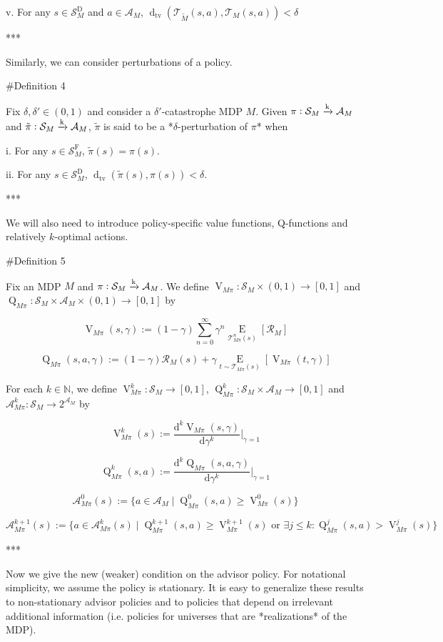 \documentclass[a4paper]{article}
\newcommand{\AP}[1]{\left(#1\right)}
\newcommand{\AB}[1]{\left[#1\right]}
\newcommand{\Ea}[2]{\underset{#1}{\operatorname{E}}\AB{#2}}
\newcommand{\D}{\mathrm{d}}
\newcommand{\Dtva}[1]{\operatorname{d}_{\text{tv}}\AP{#1}}
\newcommand{\Nats}{\mathbb{N}}
\newcommand{\M}{\xrightarrow{\textnormal{k}}}
\newcommand{\A}{\mathcal{A}}
\newcommand{\St}{\mathcal{S}}
\newcommand{\T}{\mathcal{T}}
\newcommand{\R}{\mathcal{R}}
\newcommand{\SF}{\St^{\text{F}}}
\newcommand{\SD}{\St^{\text{D}}}
\newcommand{\V}{\operatorname{V}}
\newcommand{\Q}{\operatorname{Q}}
\begin{document}
v. For any $s \in \SD_M$ and $a \in \A_M$, $\Dtva{\T_{\tilde{M}}\AP{s,a},\T_{M}\AP{s,a}} < \delta$

***

Similarly, we can consider perturbations of a policy.

\#Definition 4

Fix $\delta,\delta'\in(0,1)$ and consider a $\delta'$-catastrophe MDP $M$. Given $\pi: \St_M \M \A_M$ and $\tilde{\pi}: \St_M \M \A_M$, $\tilde{\pi}$ is said to be a *$\delta$-perturbation of $\pi$* when

i. For any $s \in \SF_M$, $\tilde{\pi}(s) = \pi(s)$.

ii. For any $s \in \SD_M$, $\Dtva{\tilde{\pi}(s),\pi(s)} < \delta$.

***

We will also need to introduce policy-specific value functions, Q-functions and relatively $k$-optimal actions.

\#Definition 5

Fix an MDP $M$ and $\pi: \St_M \M \A_M$. We define $\V_{M\pi}: \St_M \times (0,1) \rightarrow [0,1]$ and $\Q_{M\pi}: \St_M \times \A_M \times (0,1) \rightarrow [0,1]$ by

$$\V_{M\pi}(s,\gamma) := (1-\gamma) \sum_{n=0}^\infty \gamma^n \Ea{\T_{M\pi}^n(s)}{\R_M}$$

$$\Q_{M\pi}(s,a,\gamma) := (1-\gamma) \R_M(s) + \gamma \Ea{t \sim \T_{M\pi}(s)}{\V_{M\pi}(t,\gamma)}$$

For each $k \in \Nats$, we define $\V_{M\pi}^k: \St_M \rightarrow [0,1]$, $\Q_{M\pi}^k: \St_M \times \A_M \rightarrow [0,1]$ and $\A_{M\pi}^k: \St_M \rightarrow 2^{\A_M}$ by

$$\V_{M\pi}^k(s) := \frac{\D^k \V_{M\pi}(s,\gamma)}{\D\gamma^k}\bigg\vert_{\gamma=1}$$

$$\Q_{M\pi}^k(s,a) := \frac{\D^k \Q_{M\pi}(s,a,\gamma)}{\D\gamma^k}\bigg\vert_{\gamma=1}$$

$$\A_{M\pi}^0(s) := \{a \in \A_M \mid \Q_{M\pi}^0(s,a) \geq \V_{M\pi}^0(s)\}$$

$$\A_{M\pi}^{k+1}(s) := \{a \in \A_{M\pi}^k(s) \mid \Q_{M\pi}^{k+1}(s,a) \geq \V_{M\pi}^{k+1}(s) \text{ or } \exists j \leq k: \Q_{M\pi}^{j}(s,a) > \V_{M\pi}^{j}(s)\}$$

***

Now we give the new (weaker) condition on the advisor policy. For notational simplicity, we assume the policy is stationary. It is easy to generalize these results to non-stationary advisor policies and to policies that depend on irrelevant additional information (i.e. policies for universes that are *realizations* of the MDP).
\end{document}
